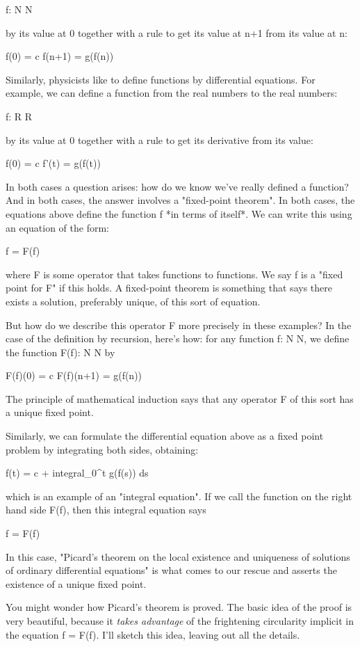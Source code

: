 f: N \to  N

by its value at 0 together with a rule to get its value at n+1 from
its value at n:

f(0)   = c
f(n+1) = g(f(n))

Similarly, physicists like to define functions by differential equations.
For example, we can define a function from the real numbers to the real
numbers:

f: R \to  R

by its value at 0 together with a rule to get its derivative from its
value:

f(0)  = c
f'(t) = g(f(t))

In both cases a question arises: how do we know we've really defined a
function?  And in both cases, the answer involves a "fixed-point
theorem".  In both cases, the equations above define the function f *in
terms of itself*.  We can write this using an equation of the form:

f = F(f)

where F is some operator that takes functions to functions.  We say
f is a "fixed point for F" if this holds.  A fixed-point theorem is
something that says there exists a solution, preferably unique, of
this sort of equation.  

But how do we describe this operator F more precisely in these examples?   
In the case of the definition by recursion, here's how: for any function 
f: N \to  N, we define the function F(f): N \to  N by 

F(f)(0)   = c
F(f)(n+1) = g(f(n))

The principle of mathematical induction says that any operator F of this
sort has a unique fixed point.   

Similarly, we can formulate the differential equation above as a fixed
point problem by integrating both sides, obtaining:

f(t) = c + integral_0^t g(f(s)) ds

which is an example of an "integral equation".  If we call the function
on the right hand side F(f), then this integral equation says

f = F(f)

In this case, "Picard's theorem on the local existence and uniqueness of
solutions of ordinary differential equations" is what comes to our
rescue and asserts the existence of a unique fixed point.

You might wonder how Picard's theorem is proved.  The basic idea of the
proof is very beautiful, because it \emph{takes advantage} of the frightening
circularity implicit in the equation f = F(f).  I'll sketch this idea,
leaving out all the details.

